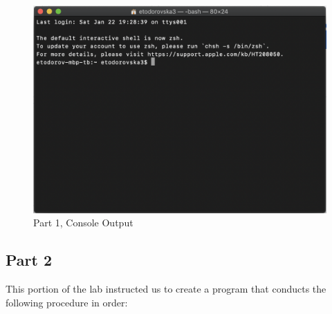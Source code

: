         \begin{figure}[H]
            \centering
            \includegraphics[width=\linewidth]{figures/placeholder.png}
            \caption{Part 1, Console Output}
            \label{fig:part1_output}
        \end{figure}



    \newpage
    \subsection{Part 2}\label{subsec:part2}
        This portion of the lab instructed us to create a program that conducts the following procedure in order:

